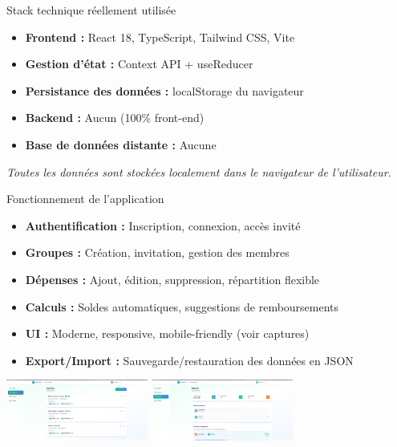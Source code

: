 \documentclass{beamer}
\begin{document}
\begin{frame}{Stack technique réellement utilisée}
\begin{itemize}
  \item \textbf{Frontend :} React 18, TypeScript, Tailwind CSS, Vite
  \item \textbf{Gestion d'état :} Context API + useReducer
  \item \textbf{Persistance des données :} localStorage du navigateur
  \item \textbf{Backend :} Aucun (100\% front-end)
  \item \textbf{Base de données distante :} Aucune
\end{itemize}
\vspace{0.5em}
\textit{\small Toutes les données sont stockées localement dans le navigateur de l'utilisateur.}
\end{frame}

\begin{frame}{Fonctionnement de l'application}
\begin{itemize}
  \item \textbf{Authentification :} Inscription, connexion, accès invité
  \item \textbf{Groupes :} Création, invitation, gestion des membres
  \item \textbf{Dépenses :} Ajout, édition, suppression, répartition flexible
  \item \textbf{Calculs :} Soldes automatiques, suggestions de remboursements
  \item \textbf{UI :} Moderne, responsive, mobile-friendly (voir captures)
  \item \textbf{Export/Import :} Sauvegarde/restauration des données en JSON
\end{itemize}
\begin{center}
  \includegraphics[width=0.35\textwidth]{app-screens/Expenses_Screen.png}
  \includegraphics[width=0.35\textwidth]{app-screens/Balances_Screen.png}
\end{center}
\end{frame}
\end{document}
